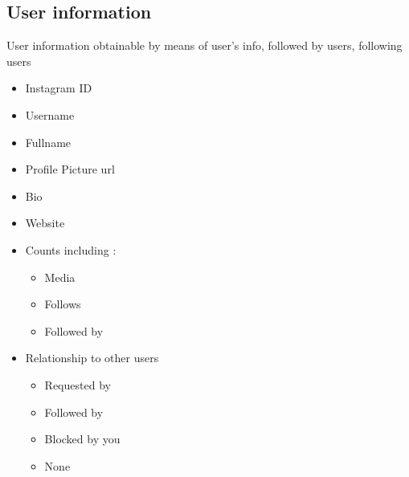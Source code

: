 \documentclass{article}
\begin{document}
\subsection{User information}\label{userInfo}
User information obtainable by means of user's info, followed by users, following users
\begin{itemize}
	\item Instagram ID
	\item Username
	\item Fullname
	\item Profile Picture url
	\item Bio
	\item Website
	\item Counts including :
	\begin{itemize}
		\item Media 
		\item Follows 
		\item Followed by
	\end{itemize}
	\item Relationship to other users
	\begin{itemize}
		\item Requested by
		\item Followed by
		\item Blocked by you
		\item None
	\end{itemize}
\end{itemize}
\end{document}
